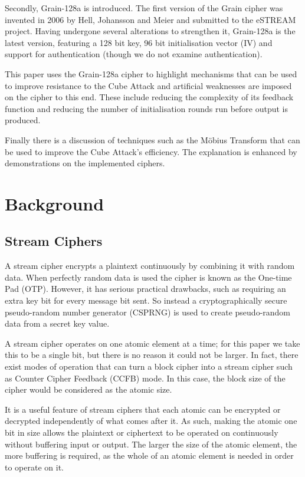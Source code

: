 \documentclass{report}
\let\Oldsection\section
\renewcommand{\section}{\FloatBarrier\Oldsection}
\begin{document}
Secondly, Grain-128a is introduced. The first version of the Grain cipher was invented in 2006 by Hell, Johansson and Meier \cite{Grain128aSpec} and submitted to the eSTREAM project. Having undergone several alterations to strengthen it, Grain-128a is the latest version, featuring a 128 bit key, 96 bit initialisation vector (IV) and support for authentication (though we do not examine authentication).

This paper uses the Grain-128a cipher to highlight mechanisms that can be used to improve resistance to the Cube Attack and artificial weaknesses are imposed on the cipher to this end. These include reducing the complexity of its feedback function and reducing the number of initialisation rounds run before output is produced.

Finally there is a discussion of techniques such as the M\"{o}bius Transform that can be used to improve the Cube Attack's efficiency. The explanation is enhanced by demonstrations on the implemented ciphers.

\chapter{Background}
\section{Stream Ciphers}
A stream cipher encrypts a plaintext continuously by combining it with random data. When perfectly random data is used the cipher is known as the One-time Pad (OTP)\cite{otpDef}. However, it has serious practical drawbacks, such as requiring an extra key bit for every message bit sent\cite{otpDef}. So instead a cryptographically secure pseudo-random number generator (CSPRNG) is used to create pseudo-random data from a secret key value.

A stream cipher operates on one atomic element at a time; for this paper we take this to be a single bit, but there is no reason it could not be larger. In fact, there exist modes of operation that can turn a block cipher into a stream cipher such as Counter Cipher Feedback (CCFB) mode\cite{counterMode}. In this case, the block size of the cipher would be considered as the atomic size.

It is a useful feature of stream ciphers that each atomic can be encrypted or decrypted independently of what comes after it. As such, making the atomic one bit in size allows the plaintext or ciphertext to be operated on continuously without buffering input or output. The larger the size of the atomic element, the more buffering is required, as the whole of an atomic element is needed in order to operate on it.
\end{document}
